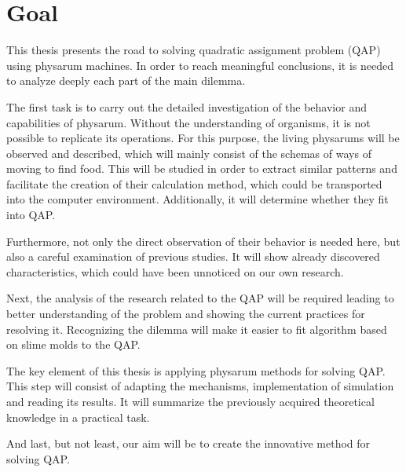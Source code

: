 \section{Goal}
\label{section:introduction_goal}

This thesis presents the road to solving quadratic assignment problem (QAP) using physarum machines. In order to reach meaningful conclusions, it is needed to analyze deeply each part of the main dilemma.

The first task is to carry out the detailed investigation of the behavior and capabilities of physarum. Without the understanding of organisms, it is not possible to replicate its operations. For this purpose, the living physarums will be observed and described, which will mainly consist of the schemas of ways of moving to find food. This will be studied in order to extract similar patterns and facilitate the creation of their calculation method, which could be transported into the computer environment. Additionally, it will determine whether they fit into QAP.

Furthermore, not only the direct observation of their behavior is needed here, but also a careful examination of previous studies. It will show already discovered characteristics, which could have been unnoticed on our own research.

Next, the analysis of the research related to the QAP will be required leading to better understanding of the problem and showing the current practices for resolving it. Recognizing the dilemma will make it easier to fit algorithm based on slime molds to the QAP.

The key element of this thesis is applying physarum methods for solving QAP. This step will consist of adapting the mechanisms, implementation of simulation and reading its results. It will summarize the previously acquired theoretical knowledge in a practical task.

And last, but not least, our aim will be to create the innovative method for solving QAP.
